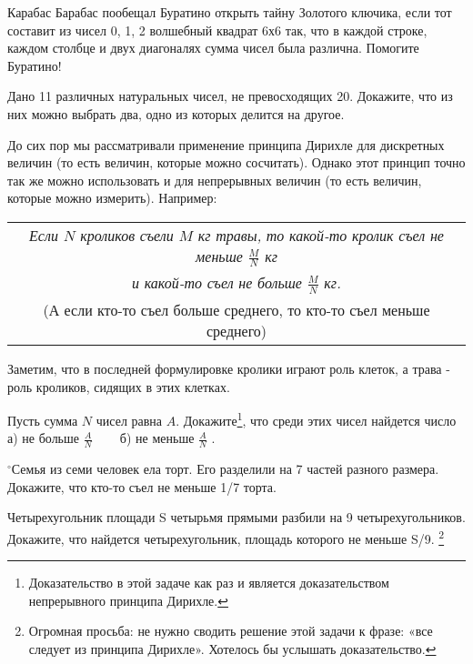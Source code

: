 \begin{thm}
	Карабас Барабас пообещал Буратино открыть тайну Золотого ключика, если тот составит из чисел 0, 1, 2 волшебный квадрат 6х6 так, что в каждой строке, каждом столбце и двух диагоналях сумма чисел была различна. Помогите Буратино!
\end{thm}

\begin{thm}
	Дано 11 различных натуральных чисел, не превосходящих 20. Докажите, что из них можно выбрать два, одно из которых делится на другое. 
\end{thm}



До сих пор мы рассматривали применение принципа Дирихле для дискретных величин (то есть величин, которые можно сосчитать). Однако этот принцип точно так же можно использовать и для непрерывных величин (то есть величин, которые можно измерить). Например:

\begin{table}[h]
	\centering	
	\begin{tabular}{|c|}
		\hline
		\textit{Если $N$ кроликов съели $M$ кг травы,} \textit{то какой-то кролик съел не меньше $\frac{M}{N}$ кг }\\
		\textit{и какой-то съел не больше $\frac{M}{N}$ кг.}\\(А если кто-то съел больше среднего, то кто-то съел меньше среднего)\\\hline
	\end{tabular}
\end{table}
Заметим, что в последней формулировке кролики играют роль клеток, а трава - роль кроликов, сидящих в этих клетках.

\begin{thm}
	Пусть сумма $N$ чисел равна $A$. Докажите\footnote{Доказательство в этой задаче как раз и является доказательством непрерывного принципа Дирихле.}, что среди этих чисел найдется число  а) не больше $\frac{A}{N}$ ~~~ б) не меньше $\frac{A}{N}$ .
\end{thm}

\begin{thm}
	$^\circ$Семья из семи человек ела торт. Его разделили на 7 частей разного размера. Докажите, что кто-то съел не меньше 1/7 торта.
\end{thm}

\begin{thm}
	Четырехугольник площади S четырьмя прямыми разбили на 9 четырехугольников. Докажите, что найдется четырехугольник, площадь которого не меньше S/9. \footnote{Огромная просьба: не нужно сводить решение этой задачи к фразе: «все следует из принципа Дирихле». Хотелось бы услышать доказательство.}
\end{thm}

